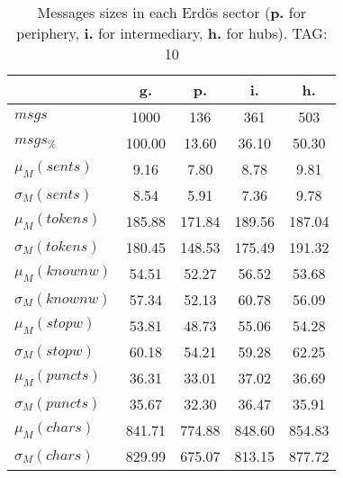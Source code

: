 \begin{table}[h!]
\begin{center}
\begin{tabular}{| l | c | c | c | c |}\hline
 & g. & p. & i. & h. \\\hline
$msgs$ & 1000  & 136  & 361  & 503 \\\hline
$msgs_{\%}$ & 100.00  & 13.60  & 36.10  & 50.30 \\\hline
$\mu_M(sents)$ & 9.16  & 7.80  & 8.78  & 9.81 \\\hline
$\sigma_M(sents)$ & 8.54  & 5.91  & 7.36  & 9.78 \\\hline
$\mu_M(tokens)$ & 185.88  & 171.84  & 189.56  & 187.04 \\\hline
$\sigma_M(tokens)$ & 180.45  & 148.53  & 175.49  & 191.32 \\\hline
$\mu_M(knownw)$ & 54.51  & 52.27  & 56.52  & 53.68 \\\hline
$\sigma_M(knownw)$ & 57.34  & 52.13  & 60.78  & 56.09 \\\hline
$\mu_M(stopw)$ & 53.81  & 48.73  & 55.06  & 54.28 \\\hline
$\sigma_M(stopw)$ & 60.18  & 54.21  & 59.28  & 62.25 \\\hline
$\mu_M(puncts)$ & 36.31  & 33.01  & 37.02  & 36.69 \\\hline
$\sigma_M(puncts)$ & 35.67  & 32.30  & 36.47  & 35.91 \\\hline
$\mu_M(chars)$ & 841.71  & 774.88  & 848.60  & 854.83 \\\hline
$\sigma_M(chars)$ & 829.99  & 675.07  & 813.15  & 877.72 \\\hline
\end{tabular}
\caption{Messages sizes in each Erd\"os sector ({{\bf p.}} for periphery, {{\bf i.}} for intermediary, {{\bf h.}} for hubs). TAG: 10}
\end{center}
\end{table}
